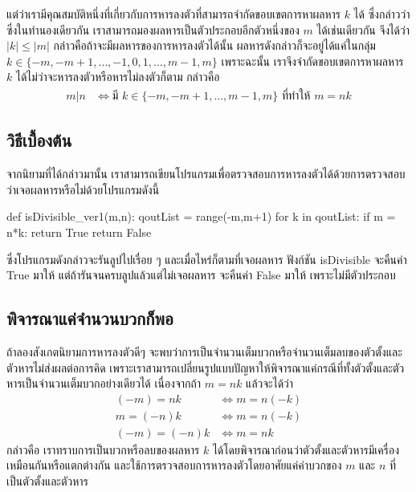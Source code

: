 แต่ว่าเรามีคุณสมบัติหนึ่งที่เกี่ยวกับการหารลงตัวที่สามารถจำกัดขอบเขตการหาผลหาร $k$ ได้ ซึ่งกล่าวว่า
ซึ่งในทำนองเดียวกัน เราสามารถมองผลหารเป็นตัวประกอบอีกตัวหนึ่งของ $m$ ได้เช่นเดียวกัน จึงได้ว่า $|k| \leq |m|$ กล่าวคือถ้าจะมีผลหารของการหารลงตัวได้นั้น ผลหารดังกล่าวก็จะอยู่ได้แค่ในกลุ่ม $k\in \{-m, -m+1, \dots, -1,0,1, \dots, m-1, m\}$ เพราะฉะนั้น เราจึงจำกัดขอบเขตการหาผลหาร $k$ ได้ไม่ว่าจะหารลงตัวหรือหารไม่ลงตัวก็ตาม กล่าวคือ
\begin{align*}
	m | n
	&\Longleftrightarrow \text{มี $k \in \{-m, -m+1, \dots, m-1, m\}$ ที่ทำให้ $m = nk$}
\end{align*}

\subsection{วิธีเบื้องต้น}
จากนิยามที่ได้กล่าวมานั้น เราสามารถเขียนโปรแกรมเพื่อตรวจสอบการหารลงตัวได้ด้วยการตรวจสอบว่าเจอผลหารหรือไม่ด้วยโปรแกรมดังนี้
\begin{python*}
def isDivisible_ver1(m,n):
    qoutList = range(-m,m+1)
    for k in qoutList:
        if m = n*k:
            return True
    return False
\end{python*}
ซึ่งโปรแกรมดังกล่าวจะรันลูปไปเรื่อย ๆ และเมื่อไหร่ก็ตามที่เจอผลหาร ฟังก์ชัน isDivisible จะคืนค่า True มาให้ แต่ถ้ารันจนครบลูปแล้วแต่ไม่เจอผลหาร จะคืนค่า False มาให้ เพราะไม่มีตัวประกอบ

\subsection{พิจารณาแค่จำนวนบวกก็พอ}
ถ้าลองสังเกตนิยามการหารลงตัวดีๆ จะพบว่าการเป็นจำนวนเต็มบวกหรือจำนวนเต็มลบของตัวตั้งและตัวหารไม่ส่งผลต่อการคิด เพราะเราสามารถเปลี่ยนรูปแบบปัญหาให้พิจารณาแค่กรณีที่ทั้งตัวตั้งและตัวหารเป็นจำนวนเต็มบวกอย่างเดียวได้ เนื่องจากถ้า $m = nk$ แล้วจะได้ว่า
\begin{align*}
	(-m) = nk &\Longleftrightarrow m = n(-k)\\
	m = (-n)k &\Longleftrightarrow m = n(-k)\\
	(-m) = (-n)k &\Longleftrightarrow m = nk
\end{align*}
กล่าวคือ เราทราบการเป็นบวกหรือลบของผลหาร $k$ ได้โดยพิจารณาก่อนว่าตัวตั้งและตัวหารมีเครื่องเหมือนกันหรือแตกต่างกัน และใช้การตรวจสอบการหารลงตัวโดยอาศัยแค่ค่าบวกของ $m$ และ $n$ ที่เป็นตัวตั้งและตัวหาร

